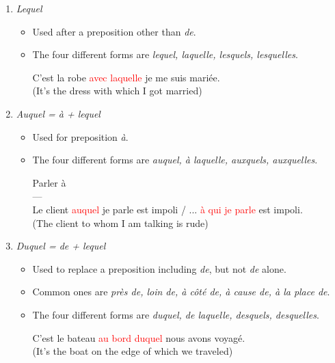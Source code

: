 \documentclass{book}
\begin{document}
\begin{enumerate}
            \item \textit{Lequel}
                \begin{itemize}
                    \item Used after a preposition other than \textit{de}.
                    \item The four different forms are \textit{lequel, laquelle, lesquels, lesquelles}.
                        \begin{center}
                            C'est la robe \textcolor{red}{avec laquelle} je me suis mariée. \\
                            (It's the dress with which I got married)
                        \end{center}
                \end{itemize}
            
            \item \textit{Auquel = à + lequel}
                \begin{itemize}
                    \item Used for preposition \textit{à}.
                    \item The four different forms are \textit{auquel, à laquelle, auxquels, auxquelles}.
                        \begin{center}
                            Parler à \\
                            --- \\
                            Le client \textcolor{red}{auquel} je parle est impoli / ... \textcolor{red}{à qui je parle} est impoli. \\
                            (The client to whom I am talking is rude)
                        \end{center}
                \end{itemize}

            \item \textit{Duquel = de + lequel}
                \begin{itemize}
                    \item Used to replace a preposition including \textit{de}, but not \textit{de} alone.
                    \item Common ones are \textit{près de, loin de, à côté de, à cause de, à la place de}.
                    \item The four different forms are \textit{duquel, de laquelle, desquels, desquelles}.
                        \begin{center}
                            C'est le bateau \textcolor{red}{au bord duquel} nous avons voyagé. \\
                            (It's the boat on the edge of which we traveled)
                        \end{center}
                \end{itemize}
        \end{enumerate}
    
\end{document}

